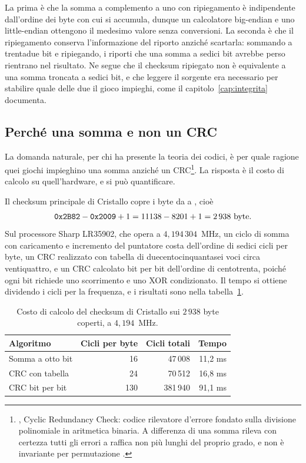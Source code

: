La prima è che la somma a complemento a uno con ripiegamento è indipendente dall'ordine dei byte con cui si accumula, dunque un calcolatore big-endian e uno little-endian ottengono il medesimo valore senza conversioni. La seconda è che il ripiegamento conserva l'informazione del riporto anziché scartarla: sommando a trentadue bit e ripiegando, i riporti che una somma a sedici bit avrebbe perso rientrano nel risultato. Ne segue che il checksum ripiegato non è equivalente a una somma troncata a sedici bit, e che leggere il sorgente era necessario per stabilire quale delle due il gioco impieghi, come il capitolo~\ref{cap:integrita} documenta.

\subsection{Perché una somma e non un CRC}

La domanda naturale, per chi ha presente la teoria dei codici, è per quale ragione quei giochi impieghino una somma anziché un CRC\footnote{, Cyclic Redundancy Check: codice rilevatore d'errore fondato sulla divisione polinomiale in aritmetica binaria. A differenza di una somma rileva con certezza tutti gli errori a raffica non più lunghi del proprio grado, e non è invariante per permutazione \cite{peterson-brown}.}. La risposta è il costo di calcolo su quell'hardware, e si può quantificare.

Il checksum principale di Cristallo copre i byte da  a , cioè
\[
\texttt{0x2B82} - \texttt{0x2009} + 1 = 11138 - 8201 + 1 = 2\,938 \text{ byte}.
\]
Sul processore Sharp LR35902, che opera a $4{,}194\,304$~MHz, un ciclo di somma con caricamento e incremento del puntatore costa dell'ordine di sedici cicli per byte, un CRC realizzato con tabella di duecentocinquantasei voci circa ventiquattro, e un CRC calcolato bit per bit dell'ordine di centotrenta, poiché ogni bit richiede uno scorrimento e uno XOR condizionato. Il tempo si ottiene dividendo i cicli per la frequenza, e i risultati sono nella tabella~\ref{tab:crc}.

\begin{table}[htbp]
\centering
\caption{Costo di calcolo del checksum di Cristallo sui $2\,938$ byte coperti, a $4{,}194$~MHz.}\label{tab:crc}
\begin{tabular}{@{}lrrr@{}}
\toprule
Algoritmo & Cicli per byte & Cicli totali & Tempo \\
\midrule
Somma a otto bit & 16 & 47\,008 & 11,2 ms \\
CRC con tabella & 24 & 70\,512 & 16,8 ms \\
CRC bit per bit & 130 & 381\,940 & 91,1 ms \\
\bottomrule
\end{tabular}
\end{table}

